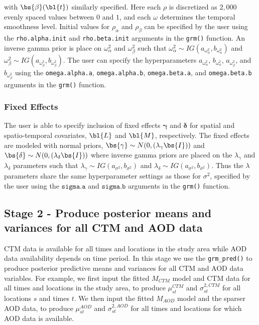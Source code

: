 with $\bs{\beta}(\bl{t})$ similarly specified. 
Here each $\rho$ is discretized as $2,000$ evenly spaced values between $0$ and $1$, and each $\omega$ determines the temporal smoothness level. 
Initial values for $\rho_{\alpha}$ and $\rho_{\beta}$ can be specified by the user using the \texttt{rho.alpha.init} and \texttt{rho.beta.init} arguments in the \texttt{grm()} function.
An inverse gamma prior is place on $\omega^2_{\alpha}$ and $\omega^2_{\beta}$ such that $\omega^2_{\alpha} \sim IG(a_{\omega_{\alpha}^2}, b_{\omega_{\alpha}^2})$ and $\omega^2_{\beta} \sim IG(a_{\omega_{\beta}^2}, b_{\omega_{\beta}^2})$.
The user can specify the hyperparameters $a_{\omega_{\alpha}^2}$, $b_{\omega_{\alpha}^2}$, $a_{\omega_{\beta}^2}$, and $b_{\omega_{\beta}^2}$ using the \texttt{omega.alpha.a}, \texttt{omega.alpha.b}, \texttt{omega.beta.a}, and \texttt{omega.beta.b} arguments in the \texttt{grm()} function.

\subsubsection*{Fixed Effects}

The user is able to specify inclusion of fixed effects $\mathbf{\gamma}$ and $\mathbf{\delta}$ for spatial and spatio-temporal covariates, $\bl{L}$ and $\bl{M}$, respectively. 
The fixed effects are modeled with normal priors, $\bs{\gamma} \sim N(0, (\lambda_{\gamma}\bs{I}))$ and $\bs{\delta} \sim N(0, (\lambda_{\delta}\bs{I}))$ where inverse gamma priors are placed on the $\lambda_{\gamma}$ and $\lambda_{\delta}$ parameters such that $\lambda_{\gamma} \sim IG(a_{\sigma^2}, b_{\sigma^2})$ and $\lambda_{\delta} \sim IG(a_{\sigma^2}, b_{\sigma^2})$.
Thus the $\lambda$ parameters share the same hyperparameter settings as those for $\sigma^2$, specified by the user using the $\texttt{sigma.a}$ and $\texttt{sigma.b}$ arguments in the \texttt{grm()} function.



\subsection*{Stage 2 - Produce posterior means and variances for all CTM and AOD data}
CTM data is available for all times and locations in the study area while AOD data availability depends on time period. 
In this stage we use the \texttt{grm\_pred()} to produce posterior predictive means and variances for all CTM and AOD data variables. 
For example, we first input the fitted $M_{CTM}$ model and CTM data for all times and locations in the study area, to produce $\mu^{CTM}_{st}$ and $\sigma^{2, CTM}_{st}$ for all locations $s$ and times $t$. 
We then input the fitted $M_{AOD}$ model and the sparser AOD data, to produce $\mu^{AOD}_{st}$ and $\sigma^{2, AOD}_{st}$ for all times and locations for which AOD data is available. 


